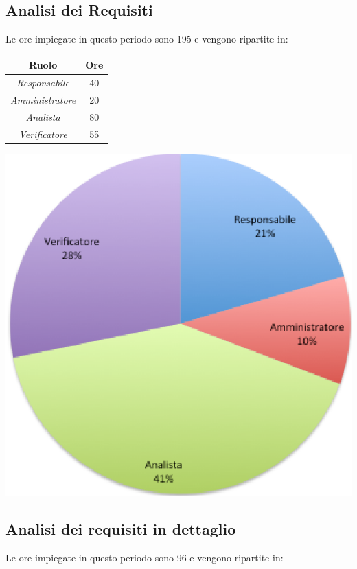 \subsection{Analisi dei Requisiti}
Le ore impiegate in questo periodo sono 195 e vengono ripartite in:
\begin{center}
  \centering
  \begin{tabular}{|c|c|}
    \hline
    \textbf{Ruolo} & \textbf{Ore} \\
    \hline
     \emph{Responsabile}  & 40 \\
    \hline  \emph{Amministratore}  & 20 \\
    \hline  \emph{Analista}  & 80 \\
    \hline  \emph{Verificatore}  & 55 \\
    \hline
  \end{tabular}
  \includegraphics[scale=0.7]{img/grafico1.png}
\end{center}




\subsection{Analisi dei requisiti in dettaglio}
Le ore impiegate in questo periodo sono 96 e vengono ripartite in:

